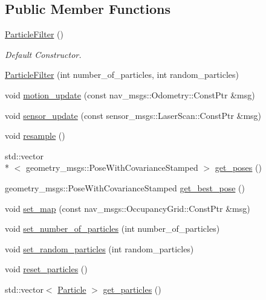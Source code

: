 \subsection*{Public Member Functions}
\begin{DoxyCompactItemize}
\item 
\hypertarget{classParticleFilter_ac5aeadcc4bf1f9f6a459562813e5b45f}{\hyperlink{classParticleFilter_ac5aeadcc4bf1f9f6a459562813e5b45f}{Particle\-Filter} ()}\label{classParticleFilter_ac5aeadcc4bf1f9f6a459562813e5b45f}

\begin{DoxyCompactList}\small\item\em Default Constructor. \end{DoxyCompactList}\item 
\hyperlink{classParticleFilter_aa1d16a1ae1d879c428e70e9c7ff62f00}{Particle\-Filter} (int number\-\_\-of\-\_\-particles, int random\-\_\-particles)
\item 
void \hyperlink{classParticleFilter_a111b1663c1865bd86e9f8666ebc88fb2}{motion\-\_\-update} (const nav\-\_\-msgs\-::\-Odometry\-::\-Const\-Ptr \&msg)
\item 
void \hyperlink{classParticleFilter_aa710931651bed02761e166cd77a49780}{sensor\-\_\-update} (const sensor\-\_\-msgs\-::\-Laser\-Scan\-::\-Const\-Ptr \&msg)
\item 
void \hyperlink{classParticleFilter_a84265f4c32f6d157da1d40677c6c47cf}{resample} ()
\item 
std\-::vector\\*
$<$ geometry\-\_\-msgs\-::\-Pose\-With\-Covariance\-Stamped $>$ \hyperlink{classParticleFilter_ac52e683f06369ef3e4741c5730db20d7}{get\-\_\-poses} ()
\item 
geometry\-\_\-msgs\-::\-Pose\-With\-Covariance\-Stamped \hyperlink{classParticleFilter_a7357ebc3eae177cead406c621940fe7c}{get\-\_\-best\-\_\-pose} ()
\item 
void \hyperlink{classParticleFilter_ab9a2cc375944db98ec7d6756660ae00e}{set\-\_\-map} (const nav\-\_\-msgs\-::\-Occupancy\-Grid\-::\-Const\-Ptr \&msg)
\item 
void \hyperlink{classParticleFilter_a789d8d5c9ccf81e10d5caa04fe11aa1a}{set\-\_\-number\-\_\-of\-\_\-particles} (int number\-\_\-of\-\_\-particles)
\item 
void \hyperlink{classParticleFilter_ac53de03b18934fa3cef2541497319bbe}{set\-\_\-random\-\_\-particles} (int random\-\_\-particles)
\item 
void \hyperlink{classParticleFilter_a6fa1de91f0c822573c6b9e0eac15050d}{reset\-\_\-particles} ()
\item 
std\-::vector$<$ \hyperlink{classParticle}{Particle} $>$ \hyperlink{classParticleFilter_a64c877049ce27490531fe0d437949929}{get\-\_\-particles} ()
\end{DoxyCompactItemize}
